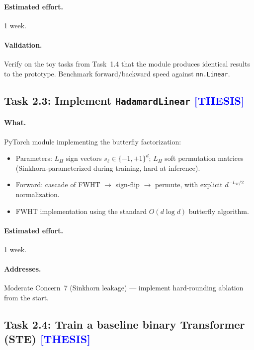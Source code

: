 \documentclass[12pt,a4paper]{article}
\newcommand{\thesis}{\texorpdfstring{\textcolor{blue}{\textbf{[THESIS]}}}{[THESIS]}}
\begin{document}
\paragraph{Estimated effort.} 1 week.

\paragraph{Validation.} Verify on the toy tasks from Task~1.4 that the module produces identical results to the prototype. Benchmark forward/backward speed against \texttt{nn.Linear}.


\subsection{Task 2.3: Implement \texttt{HadamardLinear} \thesis}

\paragraph{What.} PyTorch module implementing the butterfly factorization:
\begin{itemize}
    \item Parameters: $L_H$ sign vectors $s_\ell \in \{-1, +1\}^d$; $L_H$ soft permutation matrices (Sinkhorn-parameterized during training, hard at inference).
    \item Forward: cascade of FWHT $\to$ sign-flip $\to$ permute, with explicit $d^{-L_H/2}$ normalization.
    \item FWHT implementation using the standard $O(d \log d)$ butterfly algorithm.
\end{itemize}

\paragraph{Estimated effort.} 1 week.

\paragraph{Addresses.} Moderate Concern~7 (Sinkhorn leakage) --- implement hard-rounding ablation from the start.


\subsection{Task 2.4: Train a baseline binary Transformer (STE) \thesis}
\end{document}
